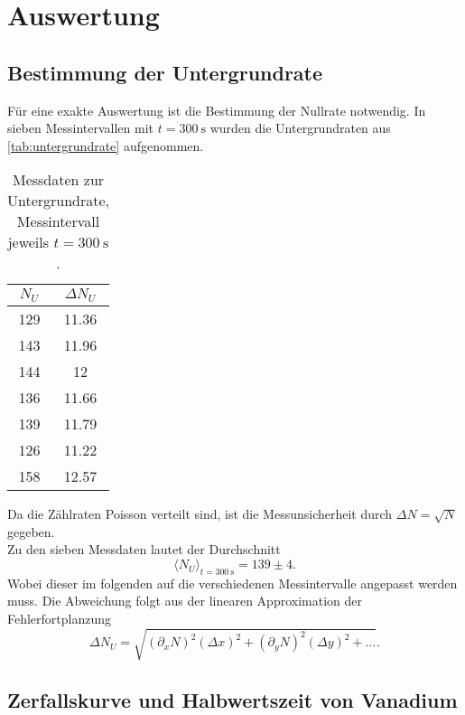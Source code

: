 \section{Auswertung}
\label{sec:Auswertung}

\subsection{Bestimmung der Untergrundrate}
\label{sec:aus:untergrundrate}

Für eine exakte Auswertung ist die Bestimmung der Nullrate notwendig.
In sieben Messintervallen mit $t = \SI{300}{\second}$ wurden die 
Untergrundraten aus \autoref{tab:untergrundrate} aufgenommen.
\begin{table}
	\centering
	\caption{Messdaten zur Untergrundrate, Messintervall jeweils $t = \SI{300}{\second}$.}
	\label{tab:untergrundrate}
	\begin{tabular}{c c}
		\toprule
		$N_U$ & $\Delta N_U$ \\
		\midrule
		129 & 11.36 \\
		143 & 11.96 \\
		144 & 12 \\
		136 & 11.66 \\
		139 & 11.79 \\
		126 & 11.22 \\
		158 & 12.57 \\
		\bottomrule
	\end{tabular}
\end{table}

\noindent
Da die Zählraten Poisson verteilt sind, ist die Messunsicherheit durch $\Delta N = \sqrt{N}$ 
gegeben.
\\
Zu den sieben Messdaten lautet der Durchschnitt
\begin{equation}
	\langle N_U \rangle_{t = \SI{300}{\second}} = 139 \pm 4.
\end{equation}
Wobei dieser im folgenden auf die verschiedenen Messintervalle angepasst werden muss.
\noindent
Die Abweichung folgt aus der linearen Approximation der Fehlerfortplanzung
\begin{equation}
	\Delta N_U = \sqrt{(\partial_x N)^2 (\Delta x)^2 + (\partial_y N)^2 (\Delta y)^2 + \hdots}.
	\label{eqn:fehlerfortpflanzung}
\end{equation}

\subsection{Zerfallskurve und Halbwertszeit von Vanadium}
\label{sec:aus:vanadium}

